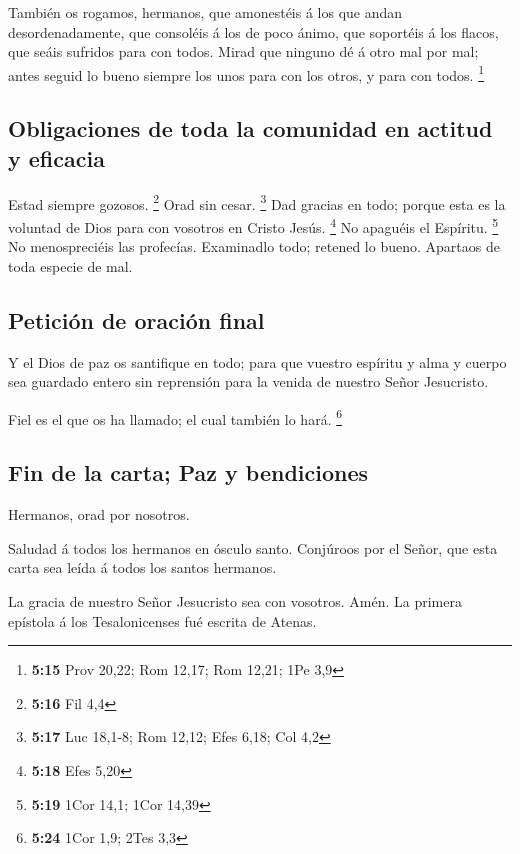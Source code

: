  También os rogamos, hermanos, que amonestéis á los que
andan desordenadamente, que consoléis á los de poco ánimo, que soportéis
á los flacos, que seáis sufridos para con todos.  Mirad
que ninguno dé á otro mal por mal; antes seguid lo bueno siempre los
unos para con los otros, y para con todos. \footnote{\textbf{5:15} Prov
  20,22; Rom 12,17; Rom 12,21; 1Pe 3,9}

\hypertarget{obligaciones-de-toda-la-comunidad-en-actitud-y-eficacia}{%
\subsection{Obligaciones de toda la comunidad en actitud y
eficacia}\label{obligaciones-de-toda-la-comunidad-en-actitud-y-eficacia}}

 Estad siempre gozosos. \footnote{\textbf{5:16} Fil 4,4}
 Orad sin cesar. \footnote{\textbf{5:17} Luc 18,1-8; Rom
  12,12; Efes 6,18; Col 4,2}  Dad gracias en todo; porque
esta es la voluntad de Dios para con vosotros en Cristo Jesús.
\footnote{\textbf{5:18} Efes 5,20}  No apaguéis el
Espíritu. \footnote{\textbf{5:19} 1Cor 14,1; 1Cor 14,39} 
No menospreciéis las profecías.  Examinadlo todo; retened
lo bueno.  Apartaos de toda especie de mal.

\hypertarget{peticiuxf3n-de-oraciuxf3n-final}{%
\subsection{Petición de oración
final}\label{peticiuxf3n-de-oraciuxf3n-final}}

 Y el Dios de paz os santifique en todo; para que vuestro
espíritu y alma y cuerpo sea guardado entero sin reprensión para la
venida de nuestro Señor Jesucristo.

 Fiel es el que os ha llamado; el cual también lo hará.
\footnote{\textbf{5:24} 1Cor 1,9; 2Tes 3,3}

\hypertarget{fin-de-la-carta-paz-y-bendiciones}{%
\subsection{Fin de la carta; Paz y
bendiciones}\label{fin-de-la-carta-paz-y-bendiciones}}

 Hermanos, orad por nosotros.

 Saludad á todos los hermanos en ósculo santo.
 Conjúroos por el Señor, que esta carta sea leída á todos
los santos hermanos.

 La gracia de nuestro Señor Jesucristo sea con vosotros.
Amén. La primera epístola á los Tesalonicenses fué escrita de Atenas.
